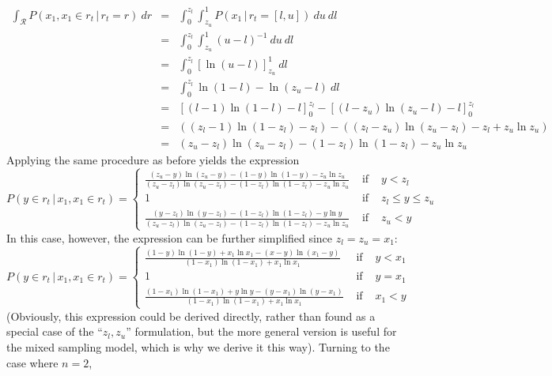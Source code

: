 \documentclass[doc]{apa6}
\newcommand{\p}{P}
\newcommand{\rt}{{r_t}}
\newcommand{\condon}{\, | \,}
\begin{document}
\begin{eqnarray}
\int_{\mathcal{R}} \p(x_1, x_1 \in \rt \condon  \rt=r) \ dr &=& \int_0^{z_l} \int_{z_u}^1 \p(x_1 \condon  \rt = [l,u]) \ du \ dl \nonumber \\
&=& \int_0^{z_l} \int_{z_u}^1 (u-l)^{-1} \ du \ dl \nonumber \\
&=& \int_0^{z_l} \left[ \ln(u-l) \right]^1_{z_u} \ dl \nonumber \\
&=& \int_0^{z_l}  \ln(1-l) - \ln(z_u -l) \ dl \nonumber \\
&=& \left[ (l-1) \ln (1-l) - l \right]^{z_l}_0 - \left[ (l-z_u) \ln (z_u-l) - l\right]^{z_l}_0 \nonumber \\
&=& \left( (z_l-1) \ln (1-z_l) -z_l \right) - \left( (z_l -z_u) \ln (z_u -z_l) - z_l +z_u \ln z_u\right) \nonumber \\
&=& (z_u -z_l) \ln (z_u -z_l) - (1-z_l) \ln (1-z_l) - z_u \ln z_u
\end{eqnarray}
Applying the same procedure as before yields the expression
\begin{equation}
\p(y \in \rt \condon  x_1, x_1 \in \rt) = \left\{ \begin{array}{rcl} \displaystyle\frac{(z_u -y) \ln (z_u -y) - (1-y) \ln (1-y) - z_u \ln z_u}{(z_u -z_l) \ln (z_u -z_l) - (1-z_l) \ln (1-z_l) - z_u \ln z_u} & \mbox{ if } & y<z_l \\ 1 & \mbox{ if } & z_l \leq y \leq z_u \\  \displaystyle\frac{(y -z_l) \ln (y -z_l) - (1-z_l) \ln (1-z_l) - y \ln y}{(z_u -z_l) \ln (z_u -z_l) - (1-z_l) \ln (1-z_l) - z_u \ln z_u} & \mbox{ if } & z_u < y  \end{array} \right.
\end{equation}
In this case, however, the expression can be further simplified since $z_l = z_u = x_1$:
\begin{equation}
\p(y \in \rt \condon  x_1, x_1 \in \rt) = \left\{ \begin{array}{rcl} \displaystyle\frac{(1-y) \ln (1-y) + x_1 \ln x_1 - (x-y) \ln (x_1-y)}{(1-x_1) \ln (1-x_1) + x_1 \ln x_1} & \mbox{ if } & y<x_1 \\ 1 & \mbox{ if } & y=x_1 \\  \displaystyle\frac{(1-x_1) \ln (1-x_1) + y \ln y - (y -x_1) \ln (y -x_1)}{ (1-x_1) \ln (1-x_1) + x_1 \ln x_1} & \mbox{ if } & x_1 < y  \end{array} \right.
\end{equation}
(Obviously, this expression could be derived directly, rather than found as a special case of the ``$z_l, z_u$'' formulation, but the more general version is useful for the mixed sampling model, which is why we derive it this way). Turning to the case where $n=2$,
\end{document}
